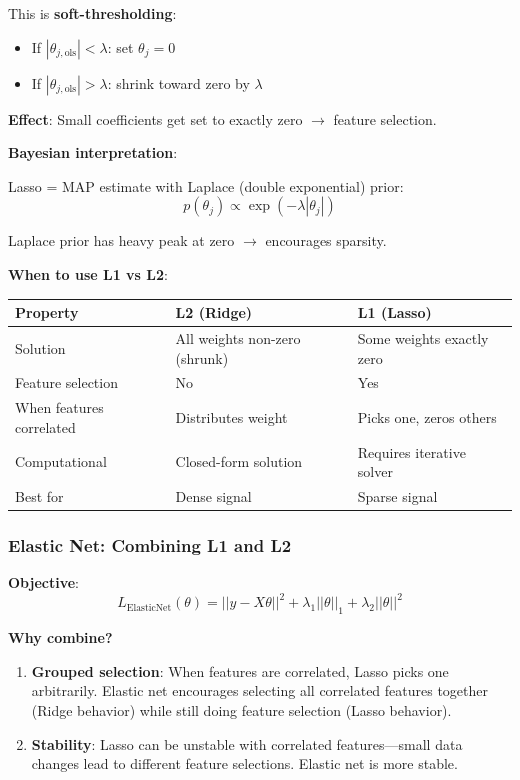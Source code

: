 \documentclass[11pt,oneside]{book}
\begin{document}
This is \textbf{soft-thresholding}:
\begin{itemize}
    \item If $|\theta_{j,\text{ols}}| < \lambda$: set $\theta_j = 0$
    \item If $|\theta_{j,\text{ols}}| > \lambda$: shrink toward zero by $\lambda$
\end{itemize}

\textbf{Effect}: Small coefficients get set to exactly zero $\rightarrow$ feature selection.

\textbf{Bayesian interpretation}:

Lasso = MAP estimate with Laplace (double exponential) prior:
\begin{equation}
p(\theta_j) \propto \exp(-\lambda|\theta_j|)
\end{equation}

Laplace prior has heavy peak at zero $\rightarrow$ encourages sparsity.

\textbf{When to use L1 vs L2}:

\begin{table}[h]
\centering
\begin{tabular}{lll}
\toprule
\textbf{Property} & \textbf{L2 (Ridge)} & \textbf{L1 (Lasso)} \\
\midrule
Solution & All weights non-zero (shrunk) & Some weights exactly zero \\
Feature selection & No & Yes \\
When features correlated & Distributes weight & Picks one, zeros others \\
Computational & Closed-form solution & Requires iterative solver \\
Best for & Dense signal & Sparse signal \\
\bottomrule
\end{tabular}
\end{table}

\subsubsection{Elastic Net: Combining L1 and L2}

\textbf{Objective}:
\begin{equation}
L_{\text{ElasticNet}}(\theta) = ||y - X\theta||^2 + \lambda_1||\theta||_1 + \lambda_2||\theta||^2
\end{equation}

\textbf{Why combine?}

\begin{enumerate}
    \item \textbf{Grouped selection}: When features are correlated, Lasso picks one arbitrarily. Elastic net encourages selecting all correlated features together (Ridge behavior) while still doing feature selection (Lasso behavior).

    \item \textbf{Stability}: Lasso can be unstable with correlated features—small data changes lead to different feature selections. Elastic net is more stable.
\end{enumerate}
\end{document}
